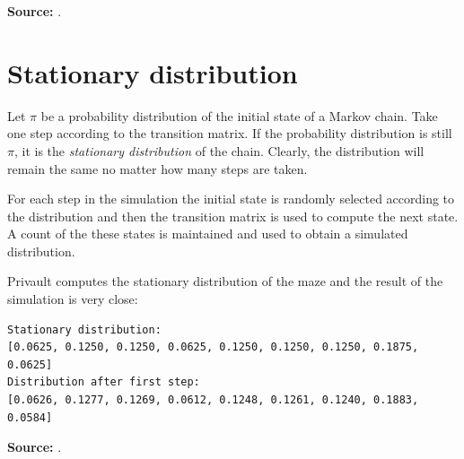 \documentclass[11pt,a4paper]{article}
\begin{document}
\textbf{Source:} \cite[Section 5.3]{privault}.


\section{Stationary distribution}\label{stationary}

Let $\pi$ be a probability distribution of the initial state of a Markov chain. Take one step according to the transition matrix. If the probability distribution is still $\pi$, it is the \emph{stationary distribution} of the chain. Clearly, the distribution will remain the same no matter how many steps are taken.

For each step in the simulation the initial state is randomly selected according to the distribution and then the transition matrix is used to compute the next state. A count of the these states is maintained and used to obtain a simulated distribution.

Privault \cite[Sections~7.2]{privault} computes the stationary distribution of the maze and the result of the simulation is very close:
\begin{verbatim}
Stationary distribution:
[0.0625, 0.1250, 0.1250, 0.0625, 0.1250, 0.1250, 0.1250, 0.1875, 0.0625]
Distribution after first step:
[0.0626, 0.1277, 0.1269, 0.0612, 0.1248, 0.1261, 0.1240, 0.1883, 0.0584]\end{verbatim}


\textbf{Source:} \cite[Section 7.2]{privault}.






\end{document}
